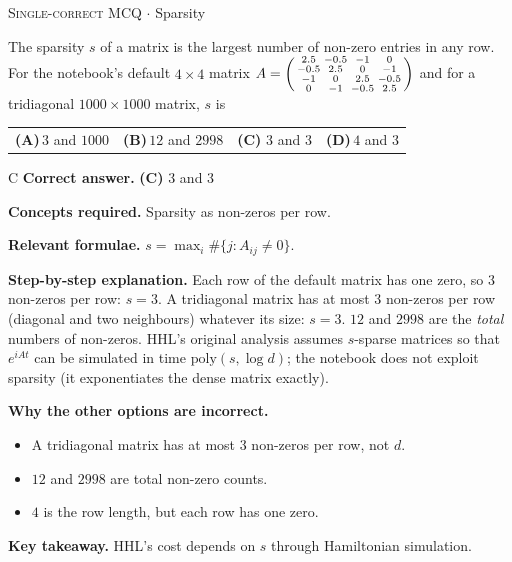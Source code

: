\documentclass[11pt,a4paper]{article}
\newcommand{\optlabel}[1]{\textbf{(#1)}}
\newcommand{\correctlabel}[1]{\textcolor{okgreen}{\textbf{(#1)}\,\ding{51}}}
\newenvironment{qitem}[1]{\begin{list}{}{\setlength{\leftmargin}{3.3em}\setlength{\labelwidth}{3.1em}%
  \setlength{\labelsep}{0.2em}\setlength{\topsep}{3pt}\setlength{\parsep}{3pt}}\item[\textbf{Q.#1}\hfill]}{\end{list}}
\newcommand{\qsep}{\par\vspace{2pt}{\color{black!15}\hrule}\vspace{4pt}}
\newcommand{\qmeta}[2]{{\footnotesize\color{black!60}\textsc{#1} \;$\cdot$\; #2}\par}
\begin{document}
\begin{qitem}{9}
\qmeta{Single-correct MCQ}{Sparsity}
The sparsity $s$ of a matrix is the largest number of non-zero entries in any row. For the notebook's default $4\times4$ matrix
$A = \begin{psmallmatrix}2.5&-0.5&-1&0\\-0.5&2.5&0&-1\\-1&0&2.5&-0.5\\0&-1&-0.5&2.5\end{psmallmatrix}$ and for a tridiagonal $1000\times1000$ matrix, $s$ is
\par\smallskip\noindent\begin{tabularx}{\linewidth}{@{}*{4}{L}@{}}
\optlabel{A}\,$3$ and $1000$ & \optlabel{B}\,$12$ and $2998$ & \correctlabel{C}\,$3$ and $3$ & \optlabel{D}\,$4$ and $3$
\end{tabularx}
\end{qitem}
\begin{solbox}{C}
\textbf{\color{brand}Correct answer.} \textcolor{okgreen}{\textbf{(C)}} $3$ and $3$

\textbf{\color{brand}Concepts required.} Sparsity as non-zeros per row.

\textbf{\color{brand}Relevant formulae.} $s = \max_i\#\{j: A_{ij} \ne 0\}$.

\textbf{\color{brand}Step-by-step explanation.} Each row of the default matrix has one zero, so $3$ non-zeros per row: $s = 3$. A tridiagonal matrix has at most $3$ non-zeros per row
(diagonal and two neighbours) whatever its size: $s = 3$. $12$ and $2998$ are the \emph{total} numbers of non-zeros. HHL's original
analysis assumes $s$-sparse matrices so that $e^{iAt}$ can be simulated in time $\mathrm{poly}(s, \log d)$; the notebook does not exploit sparsity (it
exponentiates the dense matrix exactly).

\textbf{\color{brand}Why the other options are incorrect.}
\begin{itemize}[leftmargin=2.4em, itemsep=1pt, topsep=2pt]
\item[\textbf{(A)}] A tridiagonal matrix has at most 3 non-zeros per row, not $d$.
\item[\textbf{(B)}] $12$ and $2998$ are total non-zero counts.
\item[\textbf{(D)}] $4$ is the row length, but each row has one zero.
\end{itemize}
\textbf{\color{brand}Key takeaway.} HHL's cost depends on $s$ through Hamiltonian simulation.
\end{solbox}
\qsep
\end{document}
